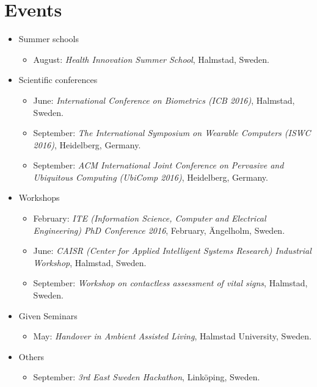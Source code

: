 \documentclass[]{report}
\begin{document}
\section*{Events}

\begin{itemize} 
	\item Summer schools
		\begin{itemize}
			\item August: \textit{Health Innovation Summer School}, Halmstad, Sweden.
		\end{itemize}
	\item Scientific conferences
		\begin{itemize}
			\item June: \textit{International Conference on Biometrics (ICB 2016)}, Halmstad, Sweden.
			\item September: \textit{The International Symposium on Wearable Computers (ISWC 2016)}, Heidelberg, Germany.
			\item September: \textit{ACM International Joint Conference on Pervasive and Ubiquitous Computing (UbiComp 2016)}, Heidelberg, Germany.
		\end{itemize}
	\item Workshops
		\begin{itemize}
			\item February: \textit{ITE (Information Science, Computer and Electrical Engineering) PhD Conference 2016}, February, \"{A}ngelholm, Sweden.
			\item June: \textit{CAISR (Center for Applied Intelligent Systems Research) Industrial Workshop}, Halmstad, Sweden.
			\item September: \textit{Workshop on contactless assessment of vital signs}, Halmstad, Sweden.
		\end{itemize}
	\item Given Seminars
		\begin{itemize}
			\item May: \textit{Handover in Ambient Assisted Living}, Halmstad University, Sweden.
		\end{itemize}
	\item Others
		\begin{itemize}
			\item September: \textit{3rd East Sweden Hackathon}, Link\"{o}ping, Sweden.
		\end{itemize}
\end{itemize}
\end{document}
